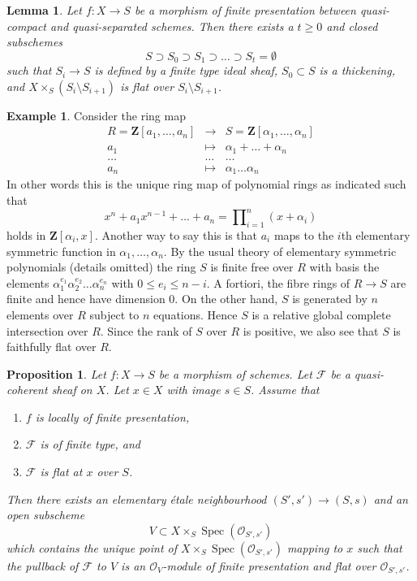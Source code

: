\documentclass{amsart}
\theoremstyle{plain}
\newtheorem{proposition}[subsection]{Proposition}
\newtheorem{lemma}[subsection]{Lemma}
\theoremstyle{definition}
\newtheorem{example}[subsection]{Example}
\theoremstyle{remark}
\numberwithin{equation}{subsection}
\def\Spec{\mathop{\mathrm{Spec}}}
\begin{document}
\begin{lemma}
\label{more-morphisms-lemma-generic-flatness-stratification-scheme}
Let $f : X \to S$ be a morphism of finite presentation between quasi-compact
and quasi-separated schemes. Then there exists a $t \geq 0$ and closed
subschemes
$$
S \supset S_0 \supset S_1 \supset \ldots \supset S_t = \emptyset
$$
such that $S_i \to S$ is defined by a finite type ideal sheaf,
$S_0 \subset S$ is a thickening, and
$X \times_S (S_i \setminus S_{i + 1})$ is flat over $S_i \setminus S_{i + 1}$.
\end{lemma}

\begin{example}
\label{algebra-example-roots-universal-polynomial}
Consider the ring map
\begin{eqnarray*}
R = \mathbf{Z}[a_1, \ldots, a_n]
& \longrightarrow &
S = \mathbf{Z}[\alpha_1, \ldots, \alpha_n] \\
a_1 & \longmapsto &
\alpha_1 + \ldots + \alpha_n \\
\ldots & \ldots & \ldots \\
a_n & \longmapsto & \alpha_1 \ldots \alpha_n
\end{eqnarray*}
In other words this is the unique ring map of polynomial
rings as indicated such that
$$
x^n + a_1 x^{n - 1} + \ldots + a_n
=
\prod\nolimits_{i = 1}^n (x + \alpha_i)
$$
holds in $\mathbf{Z}[\alpha_i, x]$. Another way to say this
is that $a_i$ maps to the $i$th elementary symmetric function
in $\alpha_1, \ldots, \alpha_n$. By the usual theory of elementary
symmetric polynomials (details omitted) the ring $S$ is finite
free over $R$ with basis the elements
$\alpha_1^{e_1} \alpha_2^{e_2} \ldots \alpha_n^{e_n}$ with
$0 \leq e_i \leq n - i$. A fortiori, the fibre rings of
$R \to S$ are finite and hence have dimension $0$.
On the other hand, $S$ is generated by
$n$ elements over $R$ subject to $n$ equations. Hence $S$
is a relative global complete intersection over $R$.
Since the rank of $S$ over $R$ is positive, we also see
that $S$ is faithfully flat over $R$.
\end{example}

\begin{proposition}
\label{proposition-finite-type-flat-at-point}
Let $f : X \to S$ be a morphism of schemes.
Let $\mathcal{F}$ be a quasi-coherent sheaf on $X$.
Let $x \in X$ with image $s \in S$.
Assume that
\begin{enumerate}
\item $f$ is locally of finite presentation,
\item $\mathcal{F}$ is of finite type, and
\item $\mathcal{F}$ is flat at $x$ over $S$.
\end{enumerate}
Then there exists an elementary \'etale neighbourhood $(S', s') \to (S, s)$
and an open subscheme
$$
V \subset X \times_S \Spec(\mathcal{O}_{S', s'})
$$
which contains the unique point of
$X \times_S \Spec(\mathcal{O}_{S', s'})$ mapping to $x$
such that the pullback of $\mathcal{F}$ to $V$ is an $\mathcal{O}_V$-module
of finite presentation and flat over $\mathcal{O}_{S', s'}$.
\end{proposition}
\end{document}
